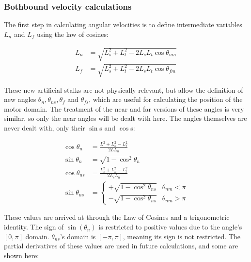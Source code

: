\documentclass[
11pt, %
english, %
singlespacing, %
headsepline, %
chapterinoneline, %
]{MastersDoctoralThesis} %
\begin{document}
\subsubsection{Bothbound velocity calculations}

The first step in calculating angular velocities is to define intermediate variables $L_n$ and $L_f$ using the law of cosines:

\begin{align}
  L_n &= \sqrt{L_s^2 + L_t^2 - 2L_sL_t\cos{\theta_{nm}}} \\
  L_f &= \sqrt{L_s^2 + L_t^2 - 2L_sL_t\cos{\theta_{fm}}}
\end{align}

These new artificial stalks are not physically relevant, but allow the definition of new angles $\theta_n, \theta_{ns}, \theta_{f}$ and $\theta_{fs}$, which are useful for calculating the position of the motor domain. The treatment of the near and far versions of these angles is very similar, so only the near angles will be dealt with here. The angles themselves are never dealt with, only their $\sin$s and $\cos$s:

\begin{align}
  \cos\theta_n &= \frac{L^2 + L_n^2 - L_f^2}{2L L_n} \\
  \sin\theta_{n} &= \sqrt{1 - \cos^2\theta_{n}} \\
  \cos\theta_{ns} &= \frac{L_s^2 + L_n^2 - L_t^2}{2L_s L_n} \\
  \sin\theta_{ns} &=
  \begin{cases}
    +\sqrt{1 - \cos^2\theta_{ns}} & \theta_{nm} < \pi \\
    -\sqrt{1 - \cos^2\theta_{ns}} & \theta_{nm} > \pi
  \end{cases}
\end{align}

These values are arrived at through the Law of Cosines and a trigonometric identity. The sign of $\sin\left(\theta_n\right)$ is restricted to positive values due to the angle's $[0,\pi]$ domain. $\theta_{ns}$'s domain is $[-\pi,\pi]$, meaning its sign is not restricted. The partial derivatives of these values are used in future calculations, and some are shown here:
\end{document}
